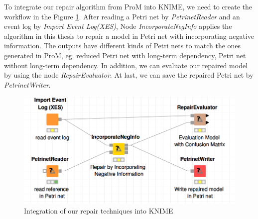 To integrate our repair algorithm from ProM into KNIME, we need to create the workflow in the Figure \ref{fig:impl-KNIME}. After reading a Petri net by  \emph{PetrinetReader} and an event log by \emph{Import Event Log(XES)}, Node \emph{IncorporateNegInfo} applies the algorithm in this thesis to repair a model in Petri net with incorporating negative information. The outputs have different kinds of Petri nets to match the ones generated in ProM, eg. reduced Petri net with long-term dependency, Petri net without long-term dependency. In addition, we can evaluate our repaired model by using the node \emph{RepairEvaluator}. At last, we can save the repaired Petri net by \emph{PetrinetWriter}.
\begin{figure}
	\centering
	\includegraphics[width=\textwidth]{figures/implementation/implementation-KNIME.png}
	\caption{Integration of our repair techniques into KNIME}
	\label{fig:impl-KNIME}
\end{figure}
